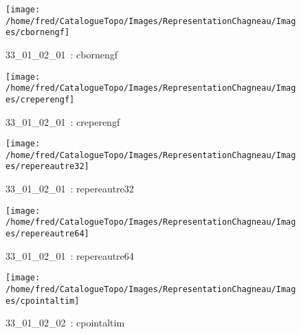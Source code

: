 \documentclass[12pt,titlepage]{book}
\begin{document}
\begin{figure}[h!]
  \hfill         %
  \begin{minipage}[t]{3cm}
    \begin{center}
      \texttt{[image: /home/fred/CatalogueTopo/Images/RepresentationChagneau/Images/cbornengf]}
      \caption[~33\_01\_02\_01]{\small{33\_01\_02\_01~:} \tiny{cbornengf}}\label{cbornengf}
    \end{center}
  \end{minipage}
  \begin{minipage}[t]{3cm}
    \begin{center}
      \texttt{[image: /home/fred/CatalogueTopo/Images/RepresentationChagneau/Images/creperengf]}
      \caption[~33\_01\_02\_01]{\small{33\_01\_02\_01~:} \tiny{creperengf}}\label{creperengf}
    \end{center}
  \end{minipage}
  \begin{minipage}[t]{3cm}
    \begin{center}
      \texttt{[image: /home/fred/CatalogueTopo/Images/RepresentationChagneau/Images/repereautre32]}
      \caption[~33\_01\_02\_01]{\small{33\_01\_02\_01~:} \tiny{repereautre32}}\label{repereautre32}
    \end{center}
  \end{minipage}
  \begin{minipage}[t]{3cm}
    \begin{center}
      \texttt{[image: /home/fred/CatalogueTopo/Images/RepresentationChagneau/Images/repereautre64]}
      \caption[~33\_01\_02\_01]{\small{33\_01\_02\_01~:} \tiny{repereautre64}}\label{repereautre64}
    \end{center}
  \end{minipage}
  \begin{minipage}[t]{3cm}
    \begin{center}
      \texttt{[image: /home/fred/CatalogueTopo/Images/RepresentationChagneau/Images/cpointaltim]}
      \caption[~33\_01\_02\_02]{\small{33\_01\_02\_02~:} \tiny{cpointaltim}}\label{cpointaltim}
    \end{center}
  \end{minipage}
  \begin{minipage}[t]{3cm}

\end{minipage}
\end{figure}
\end{document}

